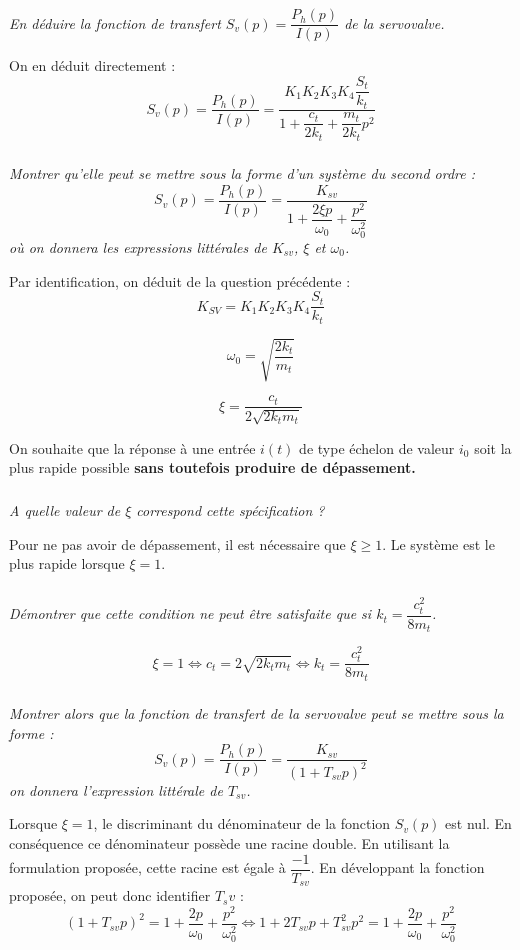 \documentclass[10pt,fleqn]{article} %
\begin{document}
\begin{multicols}{2}
\subparagraph{}
\textit{En déduire la fonction de transfert $S_v(p)=\dfrac{P_h(p)}{I(p)}$ de la servovalve.}
\ifprof
\begin{corrige}
On en déduit directement : 
$$
S_v(p)=\dfrac{P_h(p)}{I(p)} = \dfrac{K_1 K_2 K_3 K_4
\dfrac{S_t}{k_t}}{1+\dfrac{c_t}{2k_t}+\dfrac{m_t}{2k_t}p^2}
$$
\end{corrige}
\else
\fi

\subparagraph{}
\textit{Montrer qu'elle peut se mettre sous la forme d'un système du second ordre :}
$$
S_v(p)=\dfrac{P_h(p)}{I(p)}=\dfrac{K_{sv}}{1+\dfrac{2\xi p}{\omega_0}+\dfrac{p^2}{\omega_0^2}}
$$
\textit{où on donnera les expressions littérales de $K_{sv}$, $\xi$ et $\omega_0$.}

\ifprof
\begin{corrige}
Par identification, on déduit de la question précédente : 
$$
K_{SV} = K_1 K_2 K_3 K_4
\dfrac{S_t}{k_t}
$$

$$
\omega_0 = \sqrt{\dfrac{2k_t}{m_t}}
$$

$$
\xi = \dfrac{c_t}{2\sqrt{2k_t m_t}}
$$

\end{corrige}
\else
\fi

On souhaite que la réponse à une entrée $i(t)$ de type échelon de valeur $i_0$ soit la plus rapide possible \textbf{sans toutefois produire de dépassement.}

\subparagraph{}
\textit{A quelle valeur de $\xi$ correspond cette spécification ?}
\ifprof
\begin{corrige}
Pour ne pas avoir de dépassement, il est nécessaire que $\xi \geq 1$. Le
système est le plus rapide lorsque $\xi=1$.
\end{corrige}
\else
\fi

\subparagraph{}
\textit{Démontrer que cette condition ne peut être satisfaite que si $k_t=\dfrac{c_t^2}{8m_t}$.}

\ifprof
$$
\xi = 1 \Leftrightarrow  c_t = 2\sqrt{2k_t m_t} \Leftrightarrow  k_t =
\dfrac{c_t^2}{8 m_t}
$$
\else
\fi

\subparagraph{}
\textit{Montrer alors que la fonction de transfert de la servovalve peut se mettre sous la forme :}
$$
S_v(p)=\dfrac{P_h (p)}{I(p)}=\dfrac{K_{sv}}{\left( 1+T_{sv} p\right)^2 }
$$
\textit{on donnera l'expression littérale de $T_{sv}$.}
\ifprof
\begin{corrige}

Lorsque $\xi=1$, le discriminant du dénominateur de la fonction
$S_v(p)$ est nul. En conséquence ce dénominateur possède une racine double. En
utilisant la formulation proposée, cette racine est égale à
$\dfrac{-1}{T_{sv}}$. En développant la fonction proposée, on peut donc
identifier $T_sv$ :
$$
\left( 1+T_{sv} p\right)^2  = 1+\dfrac{2
p}{\omega_0}+\dfrac{p^2}{\omega_0^2}  \Leftrightarrow 1 + 2 T_{sv} p +T_{sv}^2
p^2 = 1+\dfrac{2
p}{\omega_0}+\dfrac{p^2}{\omega_0^2}   
$$


\end{corrige}
\end{multicols}
\end{document}
